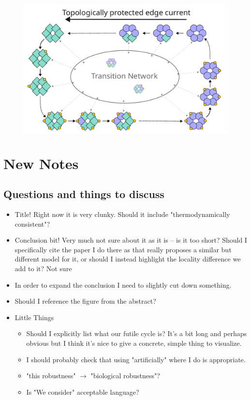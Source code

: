 \documentclass[11pt]{article}
\begin{document}
\vfill
\begin{figure}[H]
	\centering
	\includegraphics[width=\textwidth]{diagram/diagram_circly.pdf}
\end{figure}

\newpage
\printbibliography

\newpage
\section{New Notes}
\subsection{Questions and things to discuss}
\begin{itemize}
	\item Title! Right now it is very clunky. Should it include "thermodynamically consistent"?
    \item Conclusion bit! Very much not sure about it as it is -- is it too short? Should I specifically cite the paper I do there as that really proposes a similar but different model for it, or should I instead highlight the locality difference we add to it? Not sure
    \item In order to expand the conclusion I need to slightly cut down something.
	\item Should I reference the figure from the abstract?
	\item Little Things \begin{itemize}
		      \item Should I explicitly list what our futile cycle is? It's a bit long and perhaps obvious but I think it's nice to give a concrete, simple thing to visualize.
              \item I should probably check that using "artificially" where I do is appropriate.
              \item "this robustness" $\rightarrow$ "biological robustness"?
              \item Is "We consider" acceptable language?
	      \end{itemize}
\end{itemize}
\end{document}

